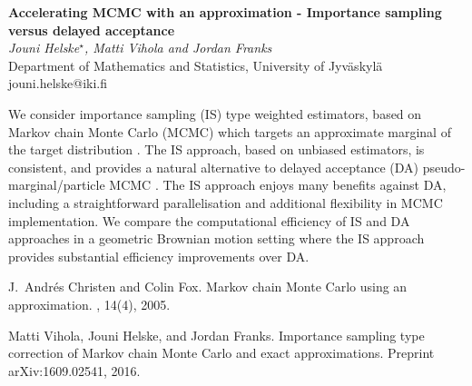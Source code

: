 \documentclass[12pt]{article}
\newcommand{\postertitle}[1]{{\Large\bf #1}\\[12pt]}
\newcommand{\authors}[1]{\emph{#1}\\}
\newcommand{\affiliations}[1]{{#1}\\}
\newcommand{\contacts}[1]{{#1}}
\begin{document}
\begin{center}
\vspace*{0.5cm}
%
\postertitle{Accelerating MCMC with an approximation - Importance sampling versus delayed acceptance}
%
\authors{Jouni Helske$^\star$, Matti Vihola and Jordan Franks} %
% 
\affiliations{Department of Mathematics and Statistics, University of Jyv{\"a}skyl{\"a}}
%
\contacts{jouni.helske@iki.fi} %
%
\vspace*{0.3cm}
\end{center}

We consider importance sampling (IS) type weighted estimators, based 
on Markov chain Monte Carlo (MCMC) which targets an approximate
marginal of the target distribution \cite{vihola-helske-franks}. The IS approach, based on
unbiased estimators, is consistent, and provides a natural alternative
to delayed acceptance (DA) pseudo-marginal/particle MCMC  \cite{christen-fox}. The IS approach
enjoys many benefits against DA, including a straightforward
parallelisation and additional flexibility in MCMC implementation. We compare the computational efficiency of IS and DA approaches in a geometric Brownian motion setting where the IS approach provides substantial efficiency improvements over DA.

\begin{thebibliography}{1}	
	
    J.~Andr{\'e}s Christen and Colin Fox.
	\newblock Markov chain {M}onte {C}arlo using an approximation.
	, 14(4), 2005.
	
	Matti Vihola, Jouni Helske, and Jordan Franks.
	\newblock Importance sampling type correction of {M}arkov chain {M}onte {C}arlo
	and exact approximations.
	\newblock Preprint arXiv:1609.02541, 2016.
\end{thebibliography}
\end{document}
